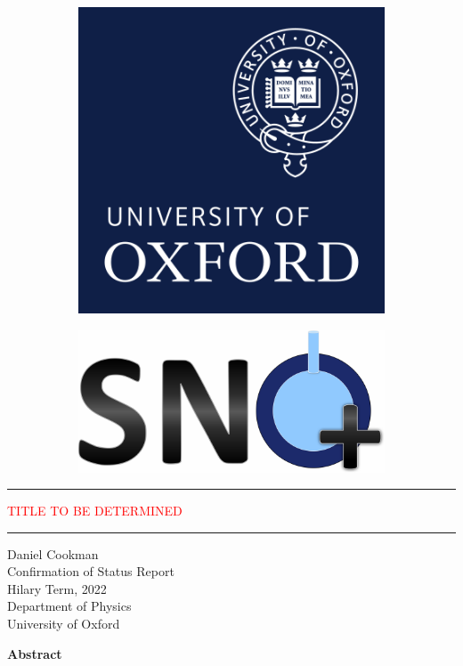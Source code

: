 \begin{center}

	\begin{figure}[h!]
        \begin{subfigure}[h!]{0.49\linewidth}
		    \includegraphics[scale=0.3,left]{images/ox_brand_cmyk_pos.png}
        \end{subfigure}
        \begin{subfigure}[h!]{0.5\linewidth}
            \includegraphics[scale=0.3,right]{images/snoplus_logo_big.pdf}
        \end{subfigure}
	\end{figure}

	\vfill

	\hrule
	\vspace{1cm}
	\Huge \textcolor{red}{TITLE TO BE DETERMINED}\\
	\vspace{1cm}
	\hrule

	\vfill


	\Large Daniel Cookman\\
	\large Confirmation of Status Report\\
    \large Hilary Term, 2022\\
	\large Department of Physics\\
    \large University of Oxford\\

	\vfill

\end{center}

	\normalsize\textbf{Abstract}\\
	\textcolor{red}{\lipsum[1]}
